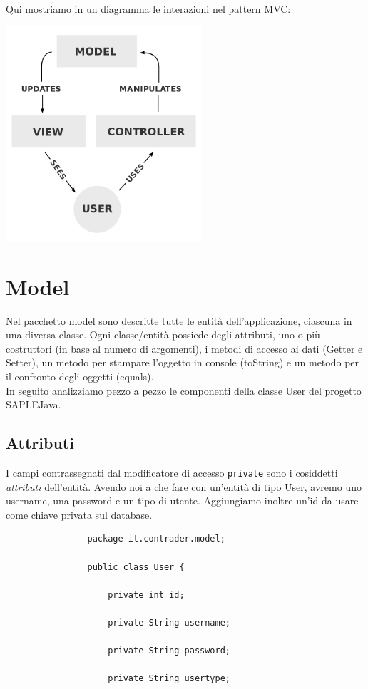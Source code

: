 \documentclass[a4paper,12 pt]{article}
\begin{document}
			\noindent Qui mostriamo in un diagramma le interazioni nel pattern MVC:\\
			
			
				\begin{center}
				\includegraphics[height=8cm]{mvc.png}
			\end{center}
			
		
	\section{Model}
		Nel pacchetto model sono descritte tutte le entità dell'applicazione, ciascuna in una diversa classe. Ogni classe/entità possiede degli attributi, uno o più costruttori (in base al numero di argomenti), i metodi di accesso ai dati (Getter e Setter), un metodo per stampare l'oggetto in console (toString) e un metodo per il confronto degli oggetti (equals).\\
		In seguito analizziamo pezzo a pezzo le componenti della classe User del progetto SAPLEJava.
		\subsection{Attributi}
			I campi contrassegnati dal modificatore di accesso \texttt{private} sono i cosiddetti \textit{attributi} dell'entità. Avendo noi a che fare con un'entità di tipo User, avremo uno username, una password e un tipo di utente. Aggiungiamo inoltre un'id da usare come chiave privata sul database.\\
			
			\begin{lstlisting}
				package it.contrader.model;
			
				public class User {
				
					private int id;
					
					private String username;
					
					private String password;
					
					private String usertype;
				
			\end{lstlisting}
\end{document}

